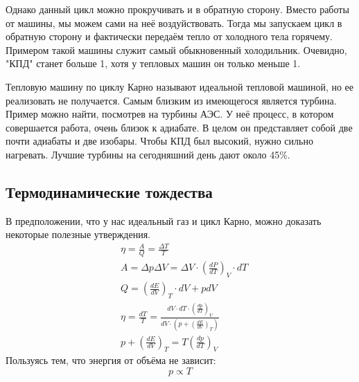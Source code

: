 \documentclass[a4paper, 12pt]{article}
\begin{document}
	Однако данный цикл можно прокручивать и в обратную сторону. Вместо работы от машины, мы можем сами на неё воздуйствовать. Тогда мы запускаем цикл в обратную сторону и фактически передаём тепло от холодного тела горячему. Примером такой машины служит самый обыкновенный холодильник. Очевидно, "КПД" станет больше 1, хотя у тепловых машин он только меньше 1. 
	
	Тепловую машину по циклу Карно называют идеальной тепловой машиной, но ее реализовать не получается. Самым близким из имеющегося является турбина. Пример можно найти, посмотрев на турбины АЭС. У неё процесс, в котором совершается работа, очень близок к адиабате. В целом он представляет собой две почти адиабаты и две изобары. Чтобы КПД был высокий, нужно сильно нагревать. Лучшие турбины на сегодняшний день дают около 45\%.  
	\subsection{Термодинамические тождества}
	В предположении, что у нас идеальный газ и цикл Карно, можно доказать некоторые полезные утверждения.
	\begin{equation*}
		\begin{aligned}
			& \eta = \frac{A}{Q} = \frac{\Delta T}{T}                                                                        \\
			& A = \Delta p \Delta V = \Delta V \cdot (\frac{dP}{dT})_{V} \cdot  dT                                           \\
			& Q = (\frac{dE}{dV})_{T} \cdot dV+pdV                                                                           \\
			& \eta = \frac{dT}{T} = \frac{ dV \cdot dT \cdot (\frac{dp}{dT})_{V}  }{ dV \cdot ( p + (\frac{dE}{dV})_{T} )  } \\
			& p+(\frac{dE}{dV}) _{T}= T (\frac{dp}{dT})_{V}                                                                  
		\end{aligned}
	\end{equation*}
	Пользуясь тем, что энергия от объёма не зависит:
	\begin{equation*}
		p \propto T
	\end{equation*}
\end{document}
